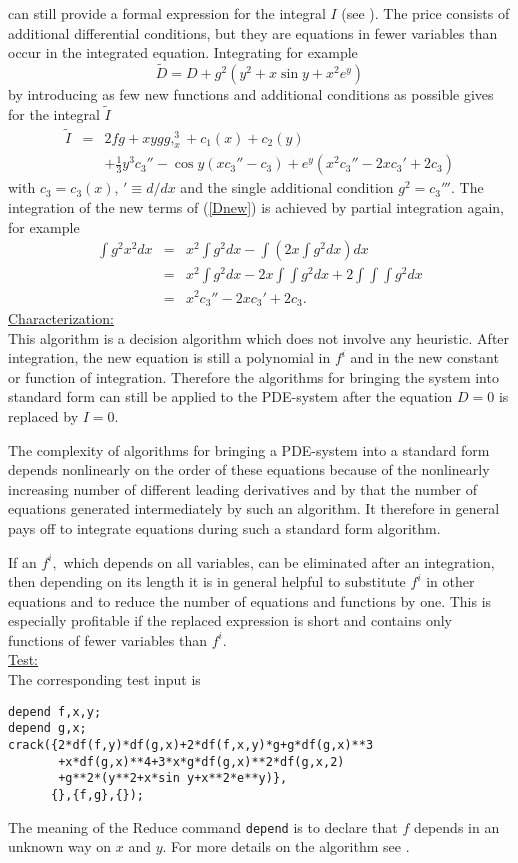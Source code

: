 \documentclass[12pt]{article}
\begin{document}
can still provide a formal expression for the integral $I$
(see \cite{Wol99e}). The price consists of
additional differential conditions, but they are equations in fewer variables
than occur in the integrated equation. Integrating for example
\begin{equation}
\tilde{D} = D + g^2(y^2 + x\sin y + x^2e^y)       \label{Dnew}
\end{equation}
by introducing as few
new functions and additional conditions as possible gives for the integral
$\tilde{I}$
\begin{eqnarray*}
\tilde{I} & = & 2fg + xygg,_{x}^{3} + c_1(x) + c_2(y) \\
  &   & + \frac{1}{3}y^3c_3'' - \cos y(xc_3'' - c_3)
+ e^y(x^2c_3'' - 2xc_3' + 2c_3)
\end{eqnarray*}
with $c_3 = c_3(x), \, '\equiv d/dx$ and the single additional
condition $g^2 = c_3'''.$
The integration of the new terms of (\ref{Dnew}) is
achieved by partial integration again, for example
\begin{eqnarray*}
\int g^2x^2 dx & = & x^2\int g^2 dx - \int (2x\!\int g^2 dx) dx \\
& = & x^2\int g^2 dx - 2x\int\!\!\int g^2 dx
+ 2 \int\!\!\int\!\!\int g^2 dx \\
& = & x^2c_3'' - 2xc_3' + 2c_3.
\end{eqnarray*}
\underline{Characterization:} \\
This algorithm is a decision algorithm which does not involve any
heuristic.
After integration, the new equation is still a polynomial
in $f^i$ and in the new constant or function of integration.
Therefore the algorithms for bringing the system into standard form can still
be applied to the PDE-system
after the equation $D = 0$ is replaced by $I = 0.$

The complexity of algorithms for bringing a PDE-system into a standard
form depends nonlinearly on the order of these equations because of
the nonlinearly increasing number of different leading derivatives
and by that the number of equations generated intermediately by such
an algorithm. It therefore in general pays off to integrate equations
during such a standard form algorithm.

If an $f^i,$ which depends on all variables, can be eliminated after an
integration, then depending on its length
it is in general helpful to substitute $f^i$ in other equations and
to reduce the number of equations and functions by one. This is especially
profitable if the replaced expression is short and
contains only functions of fewer variables than $f^i.$ \\
\underline{Test:} \\
The corresponding test input is
\begin{verbatim}
depend f,x,y;
depend g,x;
crack({2*df(f,y)*df(g,x)+2*df(f,x,y)*g+g*df(g,x)**3
       +x*df(g,x)**4+3*x*g*df(g,x)**2*df(g,x,2)
       +g**2*(y**2+x*sin y+x**2*e**y)},
      {},{f,g},{});
\end{verbatim}
The meaning of the {\sc Reduce} command {\tt depend} is to declare that $f$
depends in an unknown way on $x$ and $y$. For more details on the
algorithm see \cite{Wol99e}.
\end{document}

